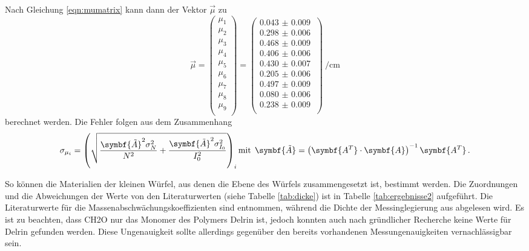 Nach Gleichung \eqref{eqn:mumatrix} kann dann der Vektor $\vec{\mu}$ zu
\begin{equation*}
  \vec{\mu}=
  \left(
      \begin{array}{r}
        \mu_1 \\
        \mu_2 \\
        \mu_3 \\
        \mu_4 \\
        \mu_5 \\
        \mu_6 \\
        \mu_7 \\
        \mu_8 \\
        \mu_9 \\
      \end{array}
      \right)=
  \left(
      \begin{array}{r}
        \SI{0.043(9)}{} \\
        \SI{0.298(6)}{} \\
        \SI{0.468(9)}{} \\
        \SI{0.406(6)}{} \\
        \SI{0.430(7)}{} \\
        \SI{0.205(6)}{} \\
        \SI{0.497(9)}{} \\
        \SI{0.080(6)}{} \\
        \SI{0.238(9)}{} \\
      \end{array}
      \right)
      \SI{}{\per\centi\meter}
\end{equation*}
berechnet werden. Die Fehler folgen aus dem Zusammenhang
\begin{equation}
  \sigma_{\mu_i} = \left(\sqrt{\frac{\symbf{\tilde{A}}^2 \sigma_{N}^2}{N^2} + \frac{\symbf{\tilde{A}}^{2} \sigma_{I_{0}}^2}{I_{0}^2}}\right)_i \\
  \text{mit}\:\: \symbf{\tilde{A}} = \left(\symbf{A^T} \cdot \symbf{A}\right)^{-1} \symbf{A^T}\,.
\end{equation}

So können die Materialien der kleinen Würfel, aus denen die Ebene des Würfels zusammengesetzt ist, bestimmt werden. Die Zuordnungen und die Abweichungen der Werte von den Literaturwerten (siehe Tabelle \ref{tab:dicke}) ist in Tabelle \ref{tab:ergebnisse2} aufgeführt.
Die Literaturwerte für die Massenabschwächungskoeffizienten sind \cite{datenbank} entnommen, während die Dichte der Messinglegierung aus \cite{messing} abgelesen wird.
Es ist zu beachten, dass CH2O nur das Monomer des Polymers Delrin ist, jedoch konnten auch nach gründlicher Recherche keine Werte für Delrin gefunden werden. Diese Ungenauigkeit sollte allerdings gegenüber den bereits vorhandenen Messungenauigkeiten vernachlässigbar sein.


